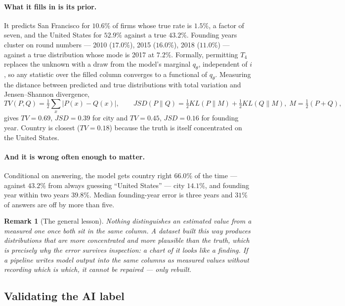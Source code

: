 \documentclass[11pt]{article}
\newtheorem{remark}{Remark}
\begin{document}
\paragraph{What it fills in is its prior.} It predicts San Francisco for
$10.6\%$ of firms whose true rate is $1.5\%$, a factor of seven, and the United
States for $52.9\%$ against a true $43.2\%$. Founding years cluster on round
numbers --- 2010 ($17.0\%$), 2015 ($16.0\%$), 2018 ($11.0\%$) --- against a
true distribution whose mode is 2017 at $7.2\%$. Formally, permitting $T_4$
replaces the unknown with a draw from the model's marginal $q_\theta$,
independent of $i$, so any statistic over the filled column converges to a
functional of $q_\theta$. Measuring the distance between predicted and true
distributions with total variation and Jensen--Shannon divergence,
\begin{equation}
TV(P,Q) = \tfrac{1}{2}\textstyle\sum_x |P(x)-Q(x)|, \qquad
JSD(P\|Q) = \tfrac{1}{2}KL(P\|M) + \tfrac{1}{2}KL(Q\|M),\; M = \tfrac{1}{2}(P+Q),
\end{equation}
gives $TV = 0.69$, $JSD = 0.39$ for city and $TV = 0.45$, $JSD = 0.16$ for
founding year. Country is closest ($TV = 0.18$) because the truth is itself
concentrated on the United States.

\paragraph{And it is wrong often enough to matter.} Conditional on answering,
the model gets country right $66.0\%$ of the time --- against $43.2\%$ from
always guessing ``United States'' --- city $14.1\%$, and founding year within
two years $39.8\%$. Median founding-year error is three years and $31\%$ of
answers are off by more than five.

\begin{remark}[The general lesson]
Nothing distinguishes an estimated value from a measured one once both sit in
the same column. A dataset built this way produces distributions that are
\emph{more} concentrated and \emph{more} plausible than the truth, which is
precisely why the error survives inspection: a chart of it looks like a
finding. If a pipeline writes model output into the same columns as measured
values without recording which is which, it cannot be repaired --- only
rebuilt.
\end{remark}

\subsection{Validating the AI label}
\label{sec:aieval}
\end{document}
